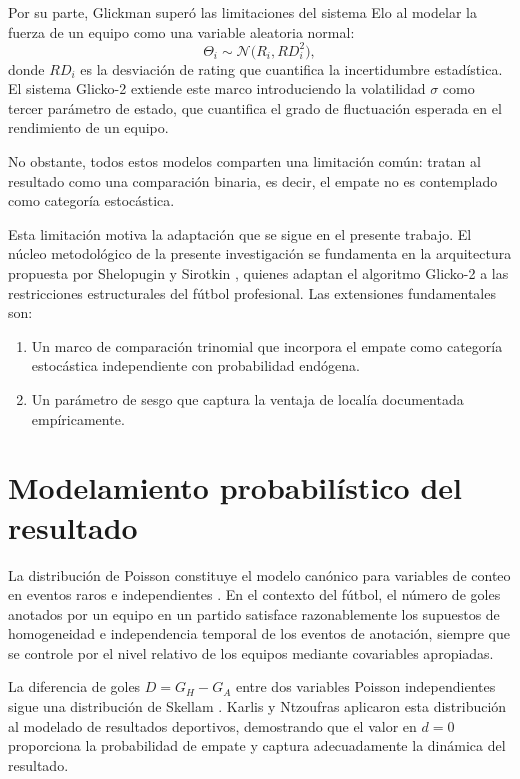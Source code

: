 Por su parte, Glickman \cite{Glickman1995} super\'o las limitaciones del sistema Elo al modelar la fuerza de un equipo como una variable aleatoria normal:
\[
\Theta_i \sim \mathcal{N}\bigl(R_i, RD_i^2\bigr),
\]
donde \(RD_i\) es la desviaci\'on de rating que cuantifica la incertidumbre estad\'istica. El sistema Glicko-2 \cite{Glickman2022} extiende este marco introduciendo la volatilidad \(\sigma\) como tercer par\'ametro de estado, que cuantifica el grado de fluctuaci\'on esperada en el rendimiento de un equipo.

No obstante, todos estos modelos comparten una limitaci\'on com\'un: tratan al resultado como una comparaci\'on binaria, es decir, el empate no es contemplado como categor\'ia estoc\'astica.

Esta limitaci\'on motiva la adaptaci\'on que se sigue en el presente trabajo. El n\'ucleo metodol\'ogico de la presente investigaci\'on se fundamenta en la arquitectura propuesta por Shelopugin y Sirotkin \cite{Glicko2Mod}, quienes adaptan el algoritmo Glicko-2 a las restricciones estructurales del f\'utbol profesional. Las extensiones fundamentales son: 

\begin{enumerate}
	\item Un marco de comparaci\'on trinomial que incorpora el empate como categor\'ia estoc\'astica independiente con probabilidad end\'ogena.
	\item Un par\'ametro de sesgo que captura la ventaja de local\'ia documentada emp\'iricamente.
\end{enumerate}

\section{Modelamiento probabil\'istico del resultado}
\label{sec:modelo_probabilistico_ant}

La distribuci\'on de Poisson constituye el modelo can\'onico para variables de conteo en eventos raros e independientes \cite{maher1982}. En el contexto del f\'utbol, el n\'umero de goles anotados por un equipo en un partido satisface razonablemente los supuestos de homogeneidad e independencia temporal de los eventos de anotaci\'on, siempre que se controle por el nivel relativo de los equipos mediante covariables apropiadas.

La diferencia de goles \(D = G_H - G_A\) entre dos variables Poisson independientes sigue una distribuci\'on de Skellam \cite{skellam1946}. Karlis y Ntzoufras \cite{karlis2003} aplicaron esta distribuci\'on al modelado de resultados deportivos, demostrando que el valor en \(d=0\) proporciona la probabilidad de empate y captura adecuadamente la din\'amica del resultado.

